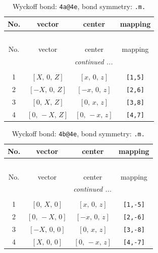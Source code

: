 \documentclass[fleqn,8pt]{jsarticle}
\begin{document}
\begin{longtable}{cccc}
\caption{Wyckoff bond: {\tt 4a@4e}, bond symmetry: {\tt .m.}}
 \\
 \hline \hline
No. & vector & center & mapping \\ \hline \endfirsthead

\multicolumn{3}{l}{\tablename\ \thetable{}} \\
 \hline \hline
No. & vector & center & mapping \\ \hline \endhead

 \hline \hline
\multicolumn{3}{r}{\footnotesize\it continued ...} \\ \endfoot

 \hline \hline
\multicolumn{3}{r}{} \\ \endlastfoot

1 & $\left[ X,\, 0,\, Z \right]$ & $\left[ x,\, 0,\, z \right]$ & {\tt [1,5]} \\ \hline
2 & $\left[ - X,\, 0,\, Z \right]$ & $\left[ - x,\, 0,\, z \right]$ & {\tt [2,6]} \\ \hline
3 & $\left[ 0,\, X,\, Z \right]$ & $\left[ 0,\, x,\, z \right]$ & {\tt [3,8]} \\ \hline
4 & $\left[ 0,\, - X,\, Z \right]$ & $\left[ 0,\, - x,\, z \right]$ & {\tt [4,7]} \\
\end{longtable}
\renewcommand{\arraystretch}{1.2}
\begin{longtable}{cccc}
\caption{Wyckoff bond: {\tt 4b@4e}, bond symmetry: {\tt .m.}}
 \\
 \hline \hline
No. & vector & center & mapping \\ \hline \endfirsthead

\multicolumn{3}{l}{\tablename\ \thetable{}} \\
 \hline \hline
No. & vector & center & mapping \\ \hline \endhead

 \hline \hline
\multicolumn{3}{r}{\footnotesize\it continued ...} \\ \endfoot

 \hline \hline
\multicolumn{3}{r}{} \\ \endlastfoot

1 & $\left[ 0,\, X,\, 0 \right]$ & $\left[ x,\, 0,\, z \right]$ & {\tt [1,-5]} \\ \hline
2 & $\left[ 0,\, - X,\, 0 \right]$ & $\left[ - x,\, 0,\, z \right]$ & {\tt [2,-6]} \\ \hline
3 & $\left[ - X,\, 0,\, 0 \right]$ & $\left[ 0,\, x,\, z \right]$ & {\tt [3,-8]} \\ \hline
4 & $\left[ X,\, 0,\, 0 \right]$ & $\left[ 0,\, - x,\, z \right]$ & {\tt [4,-7]} \\
\end{longtable}
\end{document}
